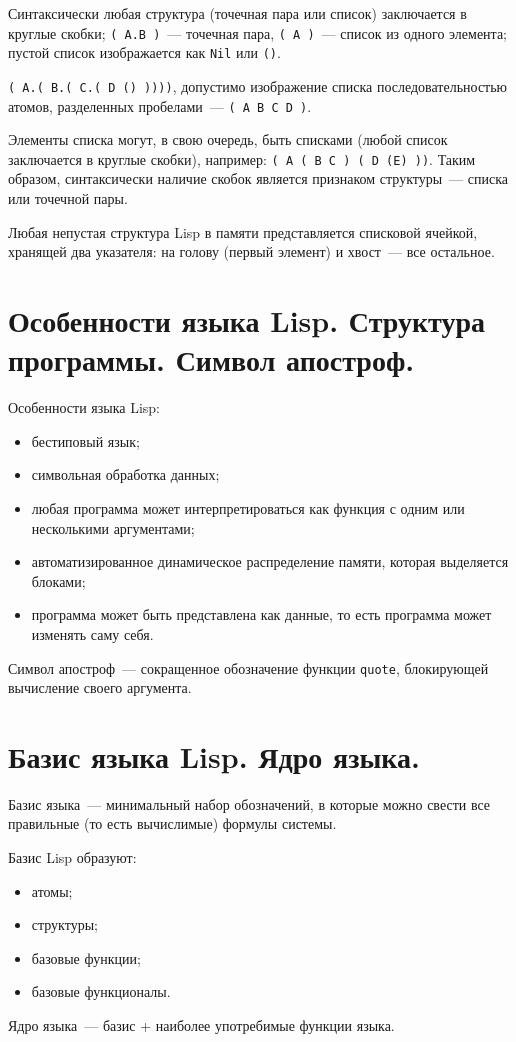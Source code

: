 Синтаксически любая структура (точечная пара или список) заключается в круглые скобки; \texttt{( A.B )}~--- точечная пара, \texttt{( A )}~--- список из одного элемента; пустой список изображается как \texttt{Nil} или \texttt{()}.

\texttt{( A.( B.( C.( D () ))))}, допустимо изображение списка последовательностью атомов, разделенных пробелами~--- \texttt{( A B C D )}.

Элементы списка могут, в свою очередь, быть списками (любой список заключается в круглые скобки), например: \texttt{( A ( B C ) ( D (E) ))}.
Таким образом, синтаксически наличие скобок является признаком структуры~--- списка или точечной пары.

Любая непустая структура Lisp в памяти представляется списковой ячейкой, хранящей два указателя: на голову (первый элемент) и хвост~--- все остальное.

\section{Особенности языка Lisp. Структура программы. Символ апостроф.}

Особенности языка Lisp:
\begin{itemize}
	\item бестиповый язык;
	\item символьная обработка данных;
	\item любая программа может интерпретироваться как функция с одним или несколькими аргументами;
	\item автоматизированное динамическое распределение памяти, которая выделяется блоками;
	\item программа может быть представлена как данные, то есть программа может изменять саму себя.
\end{itemize}

Символ апостроф~--- сокращенное обозначение функции \texttt{quote}, блокирующей вычисление своего аргумента.

\section{Базис языка Lisp. Ядро языка.}

Базис языка~--- минимальный набор обозначений, в которые можно свести все правильные (то есть вычислимые) формулы системы.

Базис Lisp образуют:
\begin{itemize}
	\item атомы;
	\item структуры;
	\item базовые функции;
	\item базовые функционалы.
\end{itemize}

Ядро языка~--- базис + наиболее употребимые функции языка.